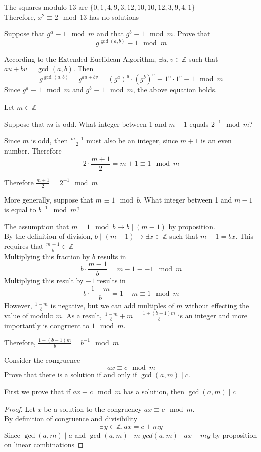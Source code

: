 \documentclass[12pt]{article}
\begin{document}
    \solution
    The squares modulo 13 are $\{0,1,4,9,3,12,10,10,12,3,9,4,1\}$\\
    Therefore, $x^2\equiv 2\mod 13$ has no solutions

    \problem Suppose that $g^a\equiv 1\mod m$ and that $g^b\equiv 1\mod m$. Prove that
    \[g^{\gcd(a,b)}\equiv 1\mod m\]

    \solution
    According to the Extended Euclidean Algorithm, $\exists u,v\in\mathbb{Z}$ such that $au+bv=\gcd(a,b)$. Then
    \[g^{\gcd(a,b)}=g^{au+bv}=(g^a)^u\cdot(g^b)^v\equiv1^u\cdot1^v\equiv 1\mod{m}\]
    Since $g^a\equiv1\mod{m}$ and $g^b\equiv1\mod{m}$, the above equation holds.

    \newpage
    \problem Let $m\in\mathbb{Z}$
    
    \subproblem Suppose that $m$ is odd. What integer between 1 and $m-1$ equals $2^{-1}\mod{m}$?

    \solution
    Since $m$ is odd, then $\frac{m+1}{2}$ must also be an integer, since $m+1$ is an even number. Therefore
    \[2\cdot\frac{m+1}{2}=m+1\equiv1\mod{m}\]

    \noindent
    Therefore $\frac{m+1}{2}=2^{-1}\mod{m}$
    
    \subproblem More generally, suppose that $m\equiv 1\mod b$. What integer between 1 and $m-1$ is equal to $b^{-1}\mod m$?

    \solution
    The assumption that $m=1\mod{b}\rightarrow b\mid (m-1)$ by proposition.\\
    By the definition of division, $b\mid (m-1)\rightarrow\exists x\in\mathbb{Z}$ such that $m-1=bx$. This requires that $\frac{m-1}{b}\in\mathbb{Z}$\\
    Multiplying this fraction by $b$ results in
    \[b\cdot\frac{m-1}{b}=m-1\equiv-1\mod{m}\]
    Multiplying this result by $-1$ results in
    \[b\cdot\frac{1-m}{b}=1-m\equiv1\mod{m}\]
    However, $\frac{1-m}{b}$ is negative, but we can add multiples of $m$ without effecting the value of modulo $m$. As a result, $\frac{1-m}{b}+m=\frac{1+(b-1)m}{b}$ is an integer and more importantly is congruent to $1\mod{m}$.

    \noindent
    Therefore, $\frac{1+(b-1)m}{b}=b^{-1}\mod{m}$

    \newpage
    \problem Consider the congruence
    \[
    ax\equiv c\mod m
    \]
    Prove that there is a solution if and only if $\gcd(a,m)\mid c$.

    \solution
    First we prove that if $ax\equiv c\mod{m}$ has a solution, then $\gcd(a,m)\mid c$
    \begin{proof}
    Let $x$ be a solution to the congruency $ax\equiv c\mod{m}$.\\
    By definition of congruence and divisibility
    \[\exists y\in\mathbb{Z},ax=c+my\]
    Since $\gcd(a,m)\mid a$ and $\gcd(a,m)\mid m$ $gcd(a,m)\mid ax-my$ by proposition on linear combinations
    \end{proof}
\end{document}
